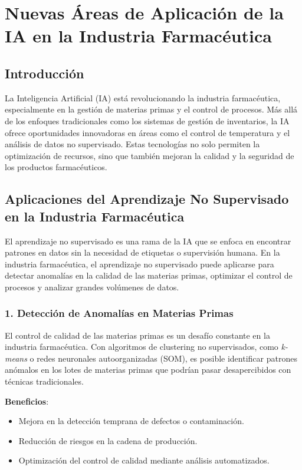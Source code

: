 \section{Nuevas Áreas de Aplicación de la IA en la Industria Farmacéutica}

\subsection{Introducción}

La Inteligencia Artificial (IA) está revolucionando la industria farmacéutica, especialmente en la gestión de materias primas y el control de procesos. Más allá de los enfoques tradicionales como los sistemas de gestión de inventarios, la IA ofrece oportunidades innovadoras en áreas como el control de temperatura y el análisis de datos no supervisado. Estas tecnologías no solo permiten la optimización de recursos, sino que también mejoran la calidad y la seguridad de los productos farmacéuticos.

\subsection{Aplicaciones del Aprendizaje No Supervisado en la Industria Farmacéutica}

El aprendizaje no supervisado es una rama de la IA que se enfoca en encontrar patrones en datos sin la necesidad de etiquetas o supervisión humana. En la industria farmacéutica, el aprendizaje no supervisado puede aplicarse para detectar anomalías en la calidad de las materias primas, optimizar el control de procesos y analizar grandes volúmenes de datos.

\subsubsection{1. Detección de Anomalías en Materias Primas}

El control de calidad de las materias primas es un desafío constante en la industria farmacéutica. Con algoritmos de clustering no supervisados, como \textit{k-means} o redes neuronales autoorganizadas (SOM), es posible identificar patrones anómalos en los lotes de materias primas que podrían pasar desapercibidos con técnicas tradicionales.

\textbf{Beneficios}:
\begin{itemize}
    \item Mejora en la detección temprana de defectos o contaminación.
    \item Reducción de riesgos en la cadena de producción.
    \item Optimización del control de calidad mediante análisis automatizados.
\end{itemize}

